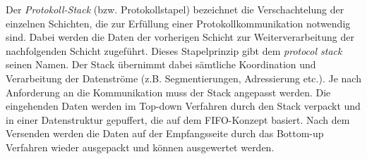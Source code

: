 Der \textit{Protokoll-Stack} (bzw. Protokollstapel) bezeichnet die
Verschachtelung der einzelnen Schichten, die zur Erf{\"u}llung einer
Protokollkommunikation notwendig sind. Dabei werden die Daten der vorherigen
Schicht zur Weiterverarbeitung der nachfolgenden Schicht zugef{\"u}hrt. Dieses
Stapelprinzip gibt dem \textit{protocol stack} seinen Namen. Der Stack
{\"u}bernimmt dabei s{\"a}mtliche Koordination und Verarbeitung der
Datenstr{\"o}me (z.B. Segmentierungen, Adressierung etc.).
Je nach Anforderung an die Kommunikation muss der Stack angepasst werden. Die
eingehenden Daten werden im Top-down Verfahren durch den Stack verpackt
und in einer Datenstruktur gepuffert, die auf dem \gls{FIFO}-Konzept basiert.
Nach dem Versenden werden die Daten auf der Empfangsseite durch das Bottom-up
Verfahren wieder ausgepackt und k{\"o}nnen ausgewertet werden.
